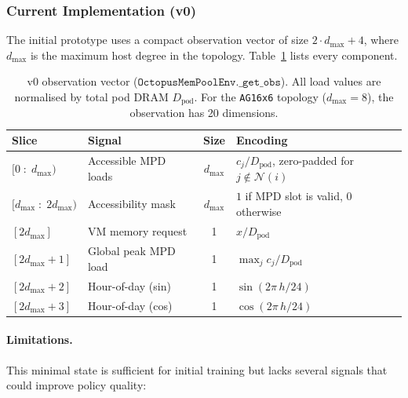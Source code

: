 \documentclass[11pt]{article}
\begin{document}
\subsubsection*{Current Implementation (v0)}

The initial prototype uses a compact observation vector of size
$2 \cdot d_{\max} + 4$, where $d_{\max}$ is the maximum host degree in the
topology.  Table~\ref{tab:states_v0} lists every component.

\begin{table}[H]
\centering
\small
\renewcommand{\arraystretch}{1.3}
\begin{tabular}{llcl}
\toprule
\textbf{Slice} & \textbf{Signal} & \textbf{Size} & \textbf{Encoding} \\
\midrule
$[0 \;:\; d_{\max})$
  & Accessible MPD loads
  & $d_{\max}$
  & $c_j / D_{\text{pod}}$, zero-padded for $j \notin \mathcal{N}(i)$ \\
$[d_{\max} \;:\; 2 d_{\max})$
  & Accessibility mask
  & $d_{\max}$
  & $1$ if MPD slot is valid, $0$ otherwise \\
$[2 d_{\max}]$
  & VM memory request
  & 1
  & $x / D_{\text{pod}}$ \\
$[2 d_{\max}{+}1]$
  & Global peak MPD load
  & 1
  & $\max_j c_j / D_{\text{pod}}$ \\
$[2 d_{\max}{+}2]$
  & Hour-of-day (sin)
  & 1
  & $\sin(2\pi\, h / 24)$ \\
$[2 d_{\max}{+}3]$
  & Hour-of-day (cos)
  & 1
  & $\cos(2\pi\, h / 24)$ \\
\bottomrule
\end{tabular}
\caption{v0 observation vector ($\texttt{OctopusMemPoolEnv.\_get\_obs}$).
All load values are normalised by total pod DRAM $D_{\text{pod}}$.
For the \texttt{AG16x6} topology ($d_{\max} = 8$), the observation
has 20 dimensions.}
\label{tab:states_v0}
\end{table}

\paragraph{Limitations.}
This minimal state is sufficient for initial training but lacks several
signals that could improve policy quality:
\end{document}

